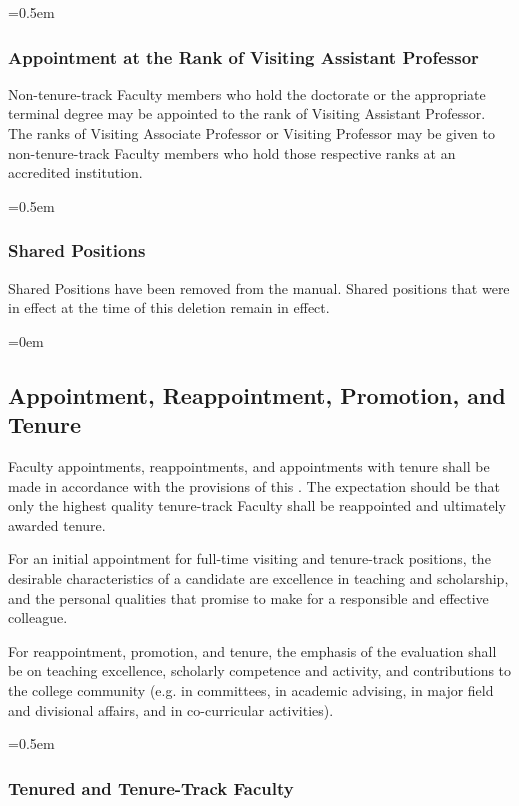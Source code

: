\documentclass{manual}
\let\oldsubsection\subsection
\renewcommand\subsection{\leftskip=0em\oldsubsection}
\let\oldsubsubsection\subsubsection
\renewcommand\subsubsection{\leftskip=0.5em\oldsubsubsection}
\begin{document}
\subsubsection{Appointment at the Rank of Visiting Assistant Professor}\label{par:AppointmentAtTheRankOfVisitingProfessor}
Non-tenure-track Faculty members who hold the doctorate or the appropriate terminal degree may be appointed to the rank of Visiting Assistant Professor. The ranks of Visiting Associate Professor or Visiting Professor may be given to non-tenure-track Faculty members who hold those respective ranks at an accredited institution.

\subsubsection{Shared Positions}
Shared Positions have been removed from the manual. Shared positions that were in effect at the time of this deletion remain in effect.


\subsection{Appointment, Reappointment, Promotion, and Tenure}\label{sec:AppointmentReappointmentPromotionAndTenure}
Faculty appointments, reappointments, and appointments with tenure shall be made in accordance with the provisions of this . The expectation should be that only the highest quality tenure-track Faculty shall be reappointed and ultimately awarded tenure.

For an initial appointment for full-time visiting and tenure-track positions, the desirable characteristics of a candidate are excellence in teaching and scholarship, and the personal qualities that promise to make for a responsible and effective colleague.

For reappointment, promotion, and tenure, the emphasis of the evaluation shall be on teaching excellence, scholarly competence and activity, and contributions to the college community (e.g. in committees, in academic advising, in major field and divisional affairs, and in co-curricular activities).

\subsubsection{Tenured and Tenure-Track Faculty}\label{sub:TenuredAndTenureTrackFaculty}
\end{document}
